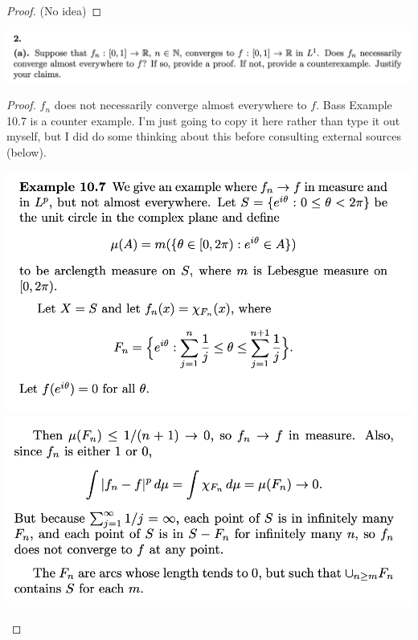 
\begin{proof}
  (No idea)
\end{proof}

\newpage
\begin{mdframed}
\includegraphics[width=400pt]{img/analysis--berkeley-202a-final-04b9.png}
\end{mdframed}

\begin{proof}
  $f_n$ does not necessarily converge almost everywhere to $f$. Bass Example 10.7 is a counter example. I'm
  just going to copy it here rather than type it out myself, but I did do some thinking about this before
  consulting external sources (below).
\begin{mdframed}
  \includegraphics[width=400pt]{img/analysis--berkeley-202a-final-35f7.png}\\
\includegraphics[width=400pt]{img/analysis--berkeley-202a-final-07d9.png}
\end{mdframed}
\end{proof}


